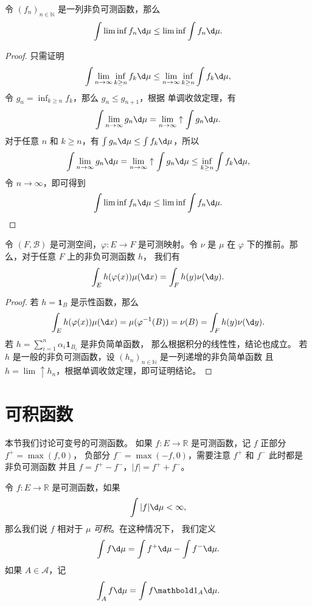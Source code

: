 \documentclass[fontset=none]{Notes}
\newcommand{\ulim}[1][]{\lim_{#1}\mathrel{\uparrow}}
\newcommand{\indicator}[1]{\mathbold 1_{#1}}
\begin{document}
\begin{theorem}[Fatou 引理]
  令 $(f_n)_{n\in \mathbb{N}}$ 是一列非负可测函数，那么
  \[
    \int \liminf f_n\d\mu\leq \liminf \int f_n\d\mu.
  \]
\end{theorem}
\begin{proof}
  只需证明
  \[
    \int\lim_{n\to\infty}\inf_{k\geq n}f_k \d\mu\leq 
    \lim_{n\to\infty}\inf_{k\geq n}\int f_k\d\mu,  
  \]
  令 $g_n=\inf_{k\geq n}f_k$，那么 $g_n\leq g_{n+1}$，根据
  单调收敛定理，有
  \[
    \int \lim_{n\to\infty}g_n\d\mu=\ulim[n\to\infty]\int g_n\d\mu.
  \]
  对于任意 $n$ 和 $k\geq n$，有 $\int g_n\d\mu\leq \int f_k\d\mu$，所以
  \[
    \int \lim_{n\to\infty}g_n\d\mu=\ulim[n\to\infty]\int g_n\d\mu
    \leq\inf_{k\geq n} \int f_k\d\mu,
  \]
  令 $n\to\infty$，即可得到
  \[
    \int \liminf f_n\d\mu\leq \liminf \int f_n\d\mu.\qedhere
  \]
\end{proof}

\begin{proposition}\label{prop:change variable}
  令 $(F,\mathcal{B})$ 是可测空间，$\varphi:E\to F$ 是可测映射。令
  $\nu$ 是 $\mu$ 在 $\varphi$ 下的推前。那么，对于任意 $F$ 上的非负可测函数 $h$，
  我们有
  \[
    \int_Eh(\varphi(x))\mu(\d x)=\int_Fh(y)\nu(\d y).
  \]
\end{proposition}
\begin{proof}
  若 $h=\indicator{B}$ 是示性函数，那么
  \[
    \int_E h(\varphi(x))\mu(\d x)=
    \mu(\varphi^{-1}(B)) =\nu(B)=\int_F h(y)\nu(\d y).
  \]
  若 $h=\sum_{i=1}^n\alpha_i\indicator{B_i}$ 是非负简单函数，
  那么根据积分的线性性，结论也成立。
  若 $h$ 是一般的非负可测函数，设 $(h_n)_{n\in \mathbb{N}}$ 是一列递增的非负简单函数
  且 $h=\ulim h_n$，根据单调收敛定理，即可证明结论。
\end{proof}



\section{可积函数}

本节我们讨论可变号的可测函数。
如果 $f:E\to \mathbb{R}$ 是可测函数，记 $f$ 正部分 $f^+=\max(f,0)$，
负部分 $f^-=\max(-f,0)$，需要注意 $f^+$ 和 $f^-$ 此时都是非负可测函数
并且 $f=f^+-f^-$，$|f|=f^++f^-$。

\begin{definition}
  令 $f:E\to \mathbb{R}$ 是可测函数，如果
  \[
    \int|f|\d\mu<\infty,
  \]
  那么我们说 $f$ 相对于 $\mu$ \emph{可积}。在这种情况下，
  我们定义
  \[
    \int f\d\mu=\int f^+\d\mu-\int f^-\d\mu.
  \]
  如果 $A\in \mathcal{A}$，记
  \[
    \int_A f\d\mu=\int f\mathbold 1_A\d\mu.
  \]
\end{definition}
\end{document}
